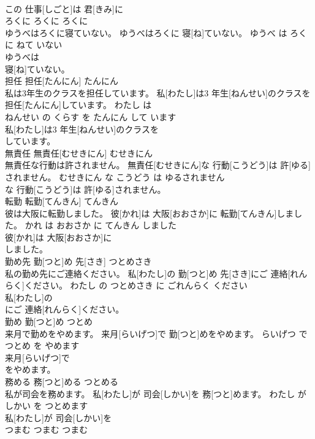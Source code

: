 \documentclass[8pt]{extreport}
\begin{document}
\begin{CJK}{UTF8}{min}
\\	この 仕事[しごと]は 君[きみ]に
\\	ろくに	ろくに	ろくに	
\\	ゆうべはろくに寝ていない。	ゆうべはろくに 寝[ね]ていない。	ゆうべ は ろくに ねて いない	
\\	ゆうべは
\\	寝[ね]ていない。			
\\	担任	担任[たんにん]	たんにん	
\\	私は3年生のクラスを担任しています。	私[わたし]は3 年生[ねんせい]のクラスを 担任[たんにん]しています。	わたし は 
\\	ねんせい の くらす を たんにん して います	
\\	私[わたし]は3 年生[ねんせい]のクラスを
\\	しています。			
\\	無責任	無責任[むせきにん]	むせきにん	
\\	無責任な行動は許されません。	無責任[むせきにん]な 行動[こうどう]は 許[ゆる]されません。	むせきにん な こうどう は ゆるされません	
\\	な 行動[こうどう]は 許[ゆる]されません。			
\\	転勤	転勤[てんきん]	てんきん	
\\	彼は大阪に転勤しました。	彼[かれ]は 大阪[おおさか]に 転勤[てんきん]しました。	かれ は おおさか に てんきん しました	
\\	彼[かれ]は 大阪[おおさか]に
\\	しました。			
\\	勤め先	勤[つと]め 先[さき]	つとめさき	
\\	私の勤め先にご連絡ください。	私[わたし]の 勤[つと]め 先[さき]にご 連絡[れんらく]ください。	わたし の つとめさき に ごれんらく ください	
\\	私[わたし]の
\\	にご 連絡[れんらく]ください。			
\\	勤め	勤[つと]め	つとめ	
\\	来月で勤めをやめます。	来月[らいげつ]で 勤[つと]めをやめます。	らいげつ で つとめ を やめます	
\\	来月[らいげつ]で
\\	をやめます。			
\\	務める	務[つと]める	つとめる	
\\	私が司会を務めます。	私[わたし]が 司会[しかい]を 務[つと]めます。	わたし が しかい を つとめます	
\\	私[わたし]が 司会[しかい]を
\\	つまむ	つまむ	つまむ	

\end{CJK}
\end{document}
